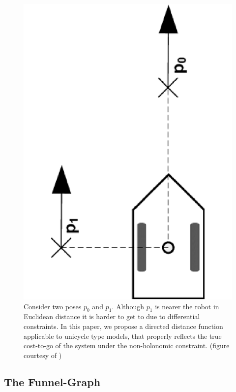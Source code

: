 \begin{figure}
  \centering
  \includegraphics[scale=.2,angle=-90]{figures/rrtfunnel/non-holonomic-vehicle-euclidean-weakness}
  \caption{Consider two poses \(p_0\) and \(p_1\). Although \(p_1\) is nearer
    the robot in Euclidean distance it is harder to get to due to differential
    constraints. In this paper, we propose a directed distance function
    applicable to unicycle type models, that properly reflects the true
    cost-to-go of the system under the non-holonomic constraint. (figure
    courtesy of \cite{parkFeedbackMotionPlanning2015})}
  \label{fig:non-holonomic-vehicle-euclidean-weakness}
\end{figure}


\subsection{The Funnel-Graph}

